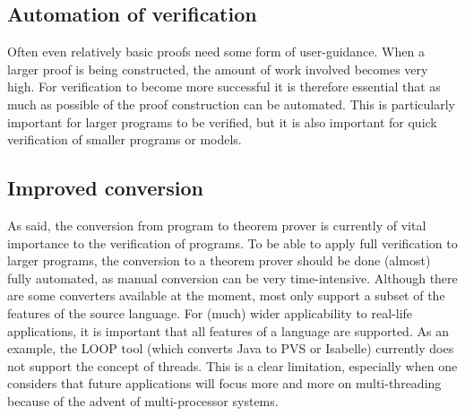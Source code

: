 \subsection{Automation of verification}
Often even relatively basic proofs need some form of user-guidance. When a larger proof is being constructed, the amount of work involved becomes very high. For verification to become more successful it is therefore essential that as much as possible of the proof construction can be automated. This is particularly important for larger programs to be verified, but it is also important for quick verification of smaller programs or models.

\subsection{Improved conversion}
As said, the conversion from program to theorem prover is currently of vital importance to the verification of programs. To be able to apply full verification to larger programs, the conversion to a theorem prover should be done (almost) fully automated, as manual conversion can be very time-intensive. Although there are some converters available at the moment, most only support a subset of the features of the source language. For (much) wider applicability to real-life applications, it is important that all features of a language are supported. As an example, the LOOP tool \cite{vandenberg01loop} (which converts Java to PVS or Isabelle) currently does not support the concept of threads. This is a clear limitation, especially when one considers that future applications will focus more and more on multi-threading because of the advent of multi-processor systems.